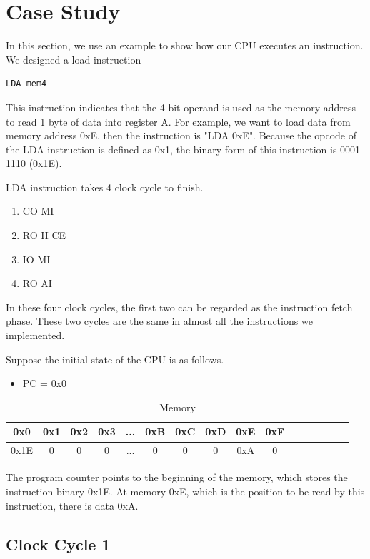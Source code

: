 \section{Case Study}
\label{sec:casestudy}
In this section, we use an example to show how our CPU executes an instruction.
We designed a load instruction
\begin{lstlisting}
LDA mem4
\end{lstlisting}
This instruction indicates that the 4-bit operand is used as the memory address to read 1 byte of data into register A. For example, we want to load data from memory address 0xE, then the instruction is "LDA 0xE". Because the opcode of the LDA instruction is defined as 0x1, the binary form of this instruction is 0001 1110 (0x1E).

LDA instruction takes 4 clock cycle to finish.

\begin{enumerate}
	\item CO MI
	\item RO II CE
	\item IO MI
	\item RO AI
\end{enumerate}

In these four clock cycles, the first two can be regarded as the instruction fetch phase. These two cycles are the same in almost all the instructions we implemented.

Suppose the initial state of the CPU is as follows.

\begin{itemize}
	\item PC = 0x0
\end{itemize}

\begin{table}[th]
	\begin{tabular}{|c|c|c|c|c|c|c|c|c|c|c|c|c|c|c|c|} 
		\hline
		0x0 & 0x1 & 0x2 & 0x3 & ...  & 0xB & 0xC & 0xD & 0xE & 0xF \\ 
		\hline
		0x1E & 0 & 0 & 0 & ... & 0 & 0 & 0 & 0xA & 0 \\
		\hline
	\end{tabular}
	\caption{Memory}
	\label{tab:memory}
\end{table}

The program counter points to the beginning of the memory, which stores the instruction binary 0x1E. At memory 0xE, which is the position to be read by this instruction, there is data 0xA.

\subsection{Clock Cycle 1}


